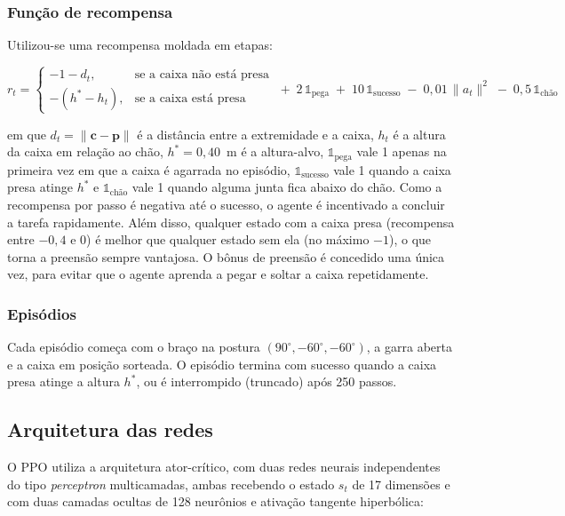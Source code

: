 \subsubsection{Função de recompensa}

Utilizou-se uma recompensa moldada em etapas:

\begin{equation}
    r_t =
    \begin{cases}
        -1 - d_t, & \text{se a caixa não está presa} \\
        -(h^{*} - h_t), & \text{se a caixa está presa}
    \end{cases}
    \; + \; 2\,\mathbb{1}_{\text{pega}} \; + \; 10\,\mathbb{1}_{\text{sucesso}} \; - \; 0{,}01\,\lVert a_t \rVert^2 \; - \; 0{,}5\,\mathbb{1}_{\text{chão}}
    \label{eq:recompensa}
\end{equation}

\noindent em que $d_t = \lVert \mathbf{c} - \mathbf{p} \rVert$ é a distância entre a extremidade e a caixa, $h_t$ é a altura da caixa em relação ao chão, $h^{*} = 0{,}40$~m é a altura-alvo, $\mathbb{1}_{\text{pega}}$ vale 1 apenas na primeira vez em que a caixa é agarrada no episódio, $\mathbb{1}_{\text{sucesso}}$ vale 1 quando a caixa presa atinge $h^{*}$ e $\mathbb{1}_{\text{chão}}$ vale 1 quando alguma junta fica abaixo do chão. Como a recompensa por passo é negativa até o sucesso, o agente é incentivado a concluir a tarefa rapidamente. Além disso, qualquer estado com a caixa presa (recompensa entre $-0{,}4$ e $0$) é melhor que qualquer estado sem ela (no máximo $-1$), o que torna a preensão sempre vantajosa. O bônus de preensão é concedido uma única vez, para evitar que o agente aprenda a pegar e soltar a caixa repetidamente.

\subsubsection{Episódios}

Cada episódio começa com o braço na postura $(90^\circ, -60^\circ, -60^\circ)$, a garra aberta e a caixa em posição sorteada. O episódio termina com sucesso quando a caixa presa atinge a altura $h^{*}$, ou é interrompido (truncado) após 250 passos.

\subsection{Arquitetura das redes}

O PPO utiliza a arquitetura ator-crítico, com duas redes neurais independentes do tipo \textit{perceptron} multicamadas, ambas recebendo o estado $s_t$ de 17 dimensões e com duas camadas ocultas de 128 neurônios e ativação tangente hiperbólica:

